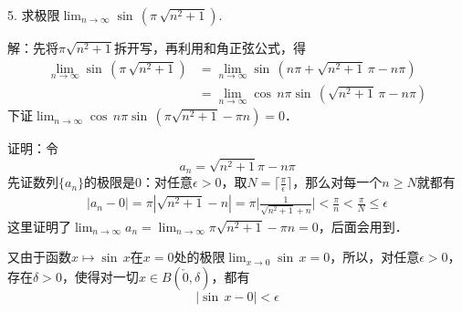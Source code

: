 5. 求极限$\displaystyle\lim_{n \to \infty} \sin \, \left(\pi \, \sqrt{n^2+1}\right)$.

解：先将$\pi \sqrt{n^2+1}$拆开写，再利用和角正弦公式，得
\begin{align}
    \lim_{n \to \infty} \sin \, \left(\pi \, \sqrt{n^2+1}\right) &= \lim_{n \to \infty} \sin \, \left( n \pi + \sqrt{n^2+1} \, \pi  - n \pi \right) \\
    &= \lim_{n \to \infty} \cos \, n \pi \sin \, \left(\sqrt{n^2+1} \, \pi - n \pi\right)
\end{align}
下证$\displaystyle\lim_{n \to \infty} \cos \, n \pi \sin \, \left( \pi \sqrt{n^2+1} - \pi n \right) = 0$．

证明：令
\begin{equation}
    a_n = \sqrt{n^2+1} \pi - n \pi
\end{equation}
先证数列$\{ a_n \}$的极限是$0$：对任意$\epsilon > 0$，取$N = \bigg\lceil \displaystyle\frac{\pi}{\epsilon} \bigg\rceil$，那么对每一个$n \geq N$就都有
\begin{align}
    |a_n-0|=\pi|\sqrt{n^2+1}-n|=\pi\bigg\lvert\displaystyle\frac{1}{\sqrt{n^2+1}+n}\bigg\rvert < \frac{\pi}{n} < \frac{\pi}{N} \leq \epsilon
\end{align}
这里证明了$\displaystyle\lim_{n \to \infty} a_n = \displaystyle\lim_{n \to \infty} \pi \sqrt{n^2+1} - \pi n = 0$，后面会用到．

又由于函数$x \mapsto \sin \, x$在$x=0$处的极限$\displaystyle\lim_{x \to 0} \sin \, x = 0$，所以，对任意$\epsilon > 0$，存在$\delta > 0$，使得对一切$x \in B(\check{0}, \delta)$，都有
\begin{equation}
    |\sin \, x - 0| < \epsilon
\end{equation}


